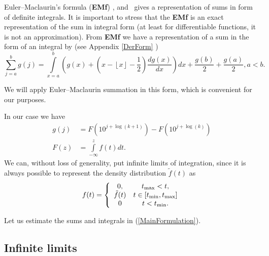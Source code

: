 \documentclass[titlepage,fleqn]{article}%
\begin{document}
\label{EulerMaclaurin}%
Euler--Maclaurin's formula (\textbf{EMf})%
\cite{knuth} ,\cite{wabramowitzstegun}
and \cite{knuth2}%
\ gives a representation of sums in form of definite integrals. It is
important to stress that the \textbf{EMf} is an exact representation of the
sum in integral form (at least for differentiable functions, it is not an
approximation). From \textbf{EMf} we have a representation of a sum in the
form of an integral by (see Appendix
\ref{DerForm}%
)\
\begin{equation}%
{\displaystyle\sum\limits_{j=a}^{b}}
g(j)=%
{\displaystyle\int\limits_{x=a}^{b}}
\left(  g(x)+\left(  x-\left\lfloor x\right\rfloor -\frac{1}{2}\right)
\frac{dg(x)}{dx}\right)  dx+\frac{g(b)}{2}+\frac{g(a)}{2},a<b. \label{EM00}%
\end{equation}


We will apply Euler--Maclaurin summation in this form, which is convenient for
our purposes.

In our case we have%
\begin{align*}
g(j)  &  =F(10^{j+\log(k+1)})-F(10^{j+\log(k)})\\
F(z)  &  =%
{\displaystyle\int\limits_{-\infty}^{z}}
f(t)dt.
\end{align*}
We can, without loss of generality, put infinite limits of integration, since
it is always possible to represent the density distribution $\tilde{f}(t)$ as%
\begin{equation}
f(t)=\left\{
\begin{array}
[c]{cc}%
0, & t_{\max}<t,\\
\tilde{f}(t) & t\in\lbrack t_{\min},t_{\max}]\\
0 & t<t_{\min}.
\end{array}
\right.  \label{EM00x}%
\end{equation}


Let us estimate the sums and integrals in (\ref{MainFormulation}).

\subsection{Infinite limits}%
\end{document}
